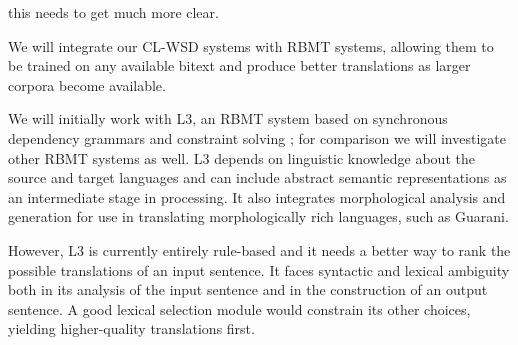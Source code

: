 this needs to get much more clear.

We will integrate our CL-WSD systems with RBMT systems, allowing them to be
trained on any available bitext and produce better translations as larger
corpora become available.

We will initially work with L3, an RBMT system based on synchronous dependency
grammars and constraint solving \cite{gasser:sxdg,gasser:aflat2012};
for comparison we will investigate other RBMT systems as well.
L3 depends on linguistic knowledge about the source and target languages and
can include abstract semantic representations as an intermediate stage in
processing. It also integrates morphological analysis and generation for use in
translating morphologically rich languages, such as Guarani.

However, L3 is currently entirely rule-based and it needs a better way to rank
the possible translations of an input sentence. It faces syntactic and lexical
ambiguity both in its analysis of the input sentence and in the construction of
an output sentence.  A good lexical selection module would constrain its other
choices, yielding higher-quality translations first.


